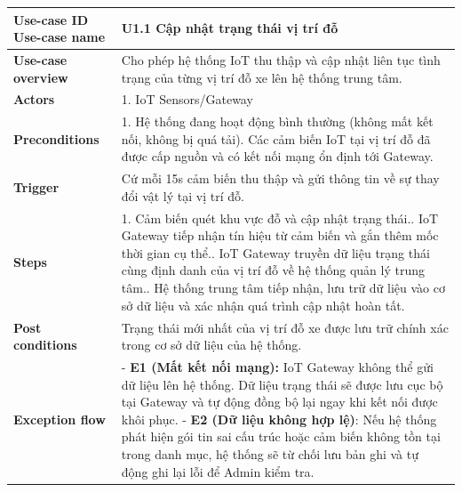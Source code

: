 \vspace{0.5cm}
\noindent
\begin{tabularx}{\textwidth}{|>{\raggedright\arraybackslash}p{4cm}|X|}
\hline
\textbf{Use-case ID} \newline \textbf{Use-case name} & U1.1 \newline \textbf{Cập nhật trạng thái vị trí đỗ} \\ \hline
\textbf{Use-case overview} & Cho phép hệ thống IoT thu thập và cập nhật liên tục tình trạng của từng vị trí đỗ xe lên hệ thống trung tâm. \\ \hline
\textbf{Actors} & 1. IoT Sensors/Gateway \\ \hline
\textbf{Preconditions} & 
1. Hệ thống đang hoạt động bình thường (không mất kết nối, không bị quá tải)\newline
2. Các cảm biến IoT tại vị trí đỗ đã được cấp nguồn và có kết nối mạng ổn định tới Gateway. \\ \hline
\textbf{Trigger} & Cứ mỗi 15s cảm biến thu thập và gửi thông tin về sự thay đổi vật lý tại vị trí đỗ. \\ \hline
\textbf{Steps} & 
1. Cảm biến quét khu vực đỗ và cập nhật trạng thái.\newline
2. IoT Gateway tiếp nhận tín hiệu từ cảm biến và gắn thêm mốc thời gian cụ thể.\newline
3. IoT Gateway truyền dữ liệu trạng thái cùng định danh của vị trí đỗ về hệ thống quản lý trung tâm.\newline
4. Hệ thống trung tâm tiếp nhận, lưu trữ dữ liệu vào cơ sở dữ liệu và xác nhận quá trình cập nhật hoàn tất. \\ \hline
\textbf{Post conditions} & Trạng thái mới nhất của vị trí đỗ xe được lưu trữ chính xác trong cơ sở dữ liệu của hệ thống. \\ \hline
\textbf{Exception flow} & 
- \textbf{E1 (Mất kết nối mạng):} IoT Gateway không thể gửi dữ liệu lên hệ thống. Dữ liệu trạng thái sẽ được lưu cục bộ tại Gateway và tự động đồng bộ lại ngay khi kết nối được khôi phục. \newline 
- \textbf{E2 (Dữ liệu không hợp lệ)}: Nếu hệ thống phát hiện gói tin sai cấu trúc hoặc cảm biến không tồn tại trong danh mục, hệ thống sẽ từ chối lưu bản ghi và tự động ghi lại lỗi để Admin kiểm tra. \\ \hline
\end{tabularx}